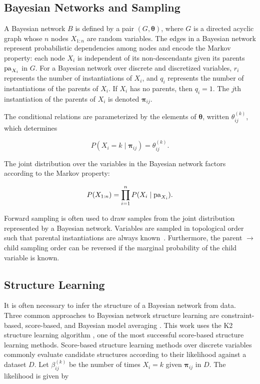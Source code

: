 \subsection{Bayesian Networks and Sampling}

A Bayesian network $B$ is defined by a pair $(G,\bm{\theta})$, where $G$ is a directed acyclic graph whose $n$ nodes $X_{1:n}$ are random variables.
The edges in a Bayesian network represent probabilistic dependencies among nodes and encode the Markov property: each node $X_i$ is independent of its non-descendants given its parents $\operatorname{pa}_{X_i}$ in $G$.
For a Bayesian network over discrete and discretized variables, $r_i$ represents the number of instantiations of $X_i$, and $q_i$ represents the number of instantiations of the parents of $X_i$.
If $X_i$ has no parents, then $q_i = 1$.
The $j$th instantiation of the parents of $X_i$ is denoted $\bm{\pi}_{ij}$.

The conditional relations are parameterized by the elements of $\bm{\theta}$, written $\theta_{ij}^{(k)}$, which determines

\begin{equation}
P(X_i = k \mid \bm{\pi}_{ij}) = \theta_{ij}^{(k)}\text{.}
\end{equation}

The joint distribution over the variables in the Bayesian network factors according to the Markov property:

\begin{equation}
P(X_{1:n}) = \prod_{i=1}^n P(X_i \mid \operatorname{pa}_{X_i})\text{.}
\end{equation}

Forward sampling is often used to draw samples from the joint distribution represented by a Bayesian network.
Variables are sampled in topological order such that parental instantiations are always known~\citep{algo_2009}.
Furthermore, the parent $\rightarrow$ child sampling order can be reversed if the marginal probability of the child variable is known.


\subsection{Structure Learning}

It is often necessary to infer the structure of a Bayesian network from data.
Three common approaches to Bayesian network structure learning are constraint-based, score-based, and Bayesian model averaging \citep[see][chap.~18]{PGM_2009}.
This work uses the K2 structure learning algorithm \citep{K2}, one of the most successful score-based structure learning methods.
Score-based structure learning methods over discrete variables commonly evaluate candidate structures according to their likelihood against a dataset $D$.
Let $\beta_{ij}^{(k)}$ be the number of times $X_i = k$ given $\bm{\pi}_{ij}$ in $D$.
The likelihood is given by

